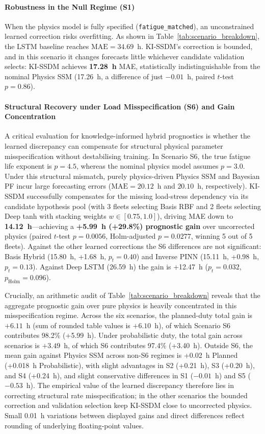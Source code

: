 \documentclass[a4paper,fleqn]{cas-dc}
\begin{document}
\paragraph{Robustness in the Null Regime (S1)}
When the physics model is fully specified (\texttt{fatigue\_matched}), an unconstrained learned correction risks overfitting. As shown in Table~\ref{tab:scenario_breakdown}, the LSTM baseline reaches $\mathrm{MAE} = 34.69$~h. KI-SSDM's correction is bounded, and in this scenario it changes forecasts little whichever candidate validation selects: KI-SSDM achieves \textbf{17.28~h} MAE, statistically indistinguishable from the nominal Physics SSM (17.26~h, a difference of just $-0.01$~h, paired $t$-test $p = 0.86$).

\paragraph{Structural Recovery under Load Misspecification (S6) and Gain Concentration}
A critical evaluation for knowledge-informed hybrid prognostics is whether the learned discrepancy can compensate for structural physical parameter misspecification without destabilising training. In Scenario S6, the true fatigue life exponent is $p = 4.5$, whereas the nominal physics model assumes $p = 3.0$. Under this structural mismatch, purely physics-driven Physics SSM and Bayesian PF incur large forecasting errors ($\mathrm{MAE} = 20.12$~h and $20.10$~h, respectively). KI-SSDM successfully compensates for the missing load-stress dependency via its candidate hypothesis pool (with 3 fleets selecting Basis RBF and 2 fleets selecting Deep tanh with stacking weights $w \in [0.75, 1.0]$), driving MAE down to \textbf{14.12~h}---achieving a \textbf{+5.99~h (+29.8\%) prognostic gain} over uncorrected physics (paired $t$-test $p = 0.0056$, Holm-adjusted $p = 0.0277$, winning 5 out of 5 fleets). Against the other learned corrections the S6 differences are not significant: Basis Hybrid (15.80~h, +1.68~h, $p_t = 0.40$) and Inverse PINN (15.11~h, +0.98~h, $p_t = 0.13$). Against Deep LSTM (26.59~h) the gain is +12.47~h ($p_t = 0.032$, $p_{\mathrm{Holm}} = 0.096$).

Crucially, an arithmetic audit of Table~\ref{tab:scenario_breakdown} reveals that the aggregate prognostic gain over pure physics is heavily concentrated in this misspecification regime. Across the six scenarios, the planned-duty total gain is $+6.11$~h (sum of rounded table values is $+6.10$~h), of which Scenario S6 contributes 98.2\% (+5.99~h). Under probabilistic duty, the total gain across scenarios is $+3.49$~h, of which S6 contributes 97.4\% (+3.40~h). Outside S6, the mean gain against Physics SSM across non-S6 regimes is +0.02~h Planned (+0.018~h Probabilistic), with slight advantages in S2 (+0.21~h), S3 (+0.20~h), and S4 (+0.24~h), and slight conservative differences in S1 ($-0.01$~h) and S5 ($-0.53$~h). The empirical value of the learned discrepancy therefore lies in correcting structural rate misspecification; in the other scenarios the bounded correction and validation selection keep KI-SSDM close to uncorrected physics. Small 0.01~h variations between displayed gains and direct differences reflect rounding of underlying floating-point values.
\end{document}
